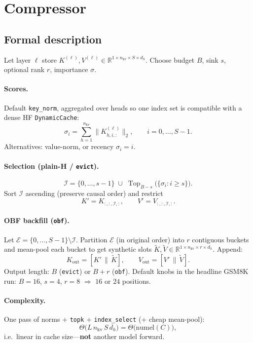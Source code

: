 \documentclass[11pt]{article}
\begin{document}
\section{Compressor}

\subsection{Formal description}

Let layer $\ell$ store
$K^{(\ell)}, V^{(\ell)}\in\mathbb{R}^{1\times n_{\mathrm{kv}}\times S\times d_h}$.
Choose budget $B$, sink $s$, optional rank $r$, importance $\sigma$.

\paragraph{Scores.}
Default \texttt{key\_norm}, aggregated over heads so one index set is
compatible with a dense HF \texttt{DynamicCache}:
\[
\sigma_i
  = \sum_{h=1}^{n_{\mathrm{kv}}}
      \bigl\|K^{(\ell)}_{h,i,:}\bigr\|_2,
\qquad i=0,\ldots,S-1.
\]
Alternatives: value-norm, or recency $\sigma_i=i$.

\paragraph{Selection (plain-H / \texttt{evict}).}
\[
\mathcal{I}
  = \{0,\ldots,s-1\}
    \;\cup\;
    \operatorname{Top}_{B-s}
    \bigl(\{\sigma_i: i\ge s\}\bigr).
\]
Sort $\mathcal{I}$ ascending (preserve causal order) and restrict
\[
K' = K_{:,:,\mathcal{I},:},\qquad V' = V_{:,:,\mathcal{I},:}.
\]

\paragraph{OBF backfill (\texttt{obf}).}
Let $\mathcal{E}=\{0,\ldots,S-1\}\setminus\mathcal{I}$.
Partition $\mathcal{E}$ (in original order) into $r$ contiguous buckets and
mean-pool each bucket to get synthetic slots
$\widetilde K,\widetilde V\in\mathbb{R}^{1\times n_{\mathrm{kv}}\times r\times d_h}$.
Append:
\[
K_{\mathrm{out}} = [K'\,\|\,\widetilde K],\qquad
V_{\mathrm{out}} = [V'\,\|\,\widetilde V].
\]
Output length: $B$ (\texttt{evict}) or $B{+}r$ (\texttt{obf}).
Default knobs in the headline GSM8K run: $B{=}16$, $s{=}4$, $r{=}8$
$\Rightarrow$ $16$ or $24$ positions.

\paragraph{Complexity.}
One pass of norms + \texttt{topk} + \texttt{index\_select} (+ cheap mean-pool):
\[
\Theta\!\bigl(L\,n_{\mathrm{kv}}\,S\,d_h\bigr)
  = \Theta\bigl(\mathrm{numel}(C)\bigr),
\]
i.e.\ linear in cache size---\textbf{not} another model forward.
\end{document}
